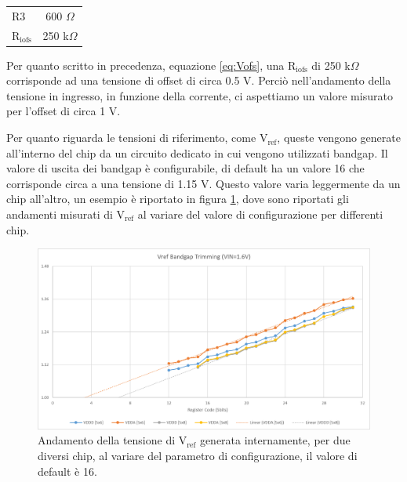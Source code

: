 \begin{center}
\begin{tabular}{lc}
\hline
$\mathrm{R3}$ & 600 $\Omega$ \\%
$\mathrm{R_{iofs}}$ & 250 k$\Omega$\\ 
\hline
\end{tabular}
\end{center}
Per quanto scritto in precedenza, equazione \ref{eq:Vofs}, una $\mathrm{R_{iofs}}$ di 250 k$\Omega$ corrisponde ad una tensione di offset di circa 0.5 V. Perciò nell'andamento della tensione in ingresso, in funzione della corrente, ci aspettiamo un valore misurato per l'offset di circa 1 V.

Per quanto riguarda le tensioni di riferimento, come $\mathrm{V_{ref}}$, queste vengono generate all'interno del chip da un circuito dedicato in cui vengono utilizzati bandgap. Il valore di uscita dei bandgap è configurabile, di default ha un valore 16 che corrisponde circa a una tensione di 1.15 V. 
Questo valore varia leggermente da un chip all'altro, un esempio è riportato in figura \ref{bandgap_trimming}, dove sono riportati gli andamenti misurati di $\mathrm{V_{ref}}$ al variare del valore di configurazione per differenti chip.

\begin{figure}
\centering
\includegraphics[scale=.5]{Immagini/bandgap_trimming}
\caption{Andamento della tensione di $\mathrm{V_{ref}}$ generata internamente, per due diversi chip, al variare del parametro di configurazione, il valore di default è 16.}
\label{bandgap_trimming}
\end{figure}

